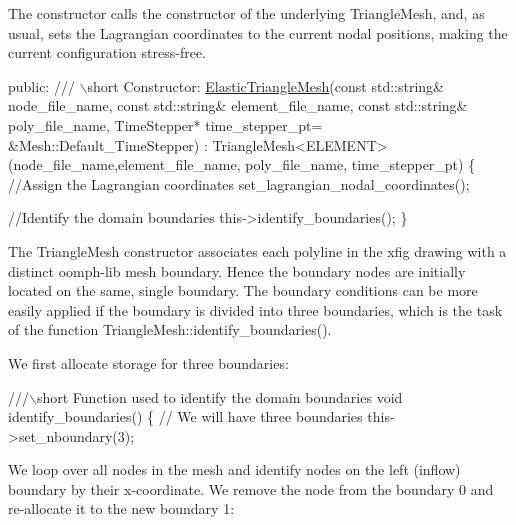 The constructor calls the constructor of the underlying {\ttfamily Triangle\+Mesh}, and, as usual, sets the Lagrangian coordinates to the current nodal positions, making the current configuration stress-\/free.


\begin{DoxyCodeInclude}
 
\textcolor{keyword}{public}:
 \textcolor{comment}{}
\textcolor{comment}{ /// \(\backslash\)short Constructor: }
\textcolor{comment}{} \hyperlink{classElasticTriangleMesh}{ElasticTriangleMesh}(\textcolor{keyword}{const} std::string& node\_file\_name,
                     \textcolor{keyword}{const} std::string& element\_file\_name,
                     \textcolor{keyword}{const} std::string& poly\_file\_name,
                     TimeStepper* time\_stepper\_pt=
                     &Mesh::Default\_TimeStepper) : 
 TriangleMesh<ELEMENT>(node\_file\_name,element\_file\_name,
                       poly\_file\_name, time\_stepper\_pt)
  \{
   \textcolor{comment}{//Assign the Lagrangian coordinates}
   set\_lagrangian\_nodal\_coordinates();
   
   \textcolor{comment}{//Identify the domain boundaries}
   this->identify\_boundaries();
  \}

\end{DoxyCodeInclude}


The {\ttfamily Triangle\+Mesh} constructor associates each polyline in the {\ttfamily xfig} drawing with a distinct {\ttfamily oomph-\/lib} mesh boundary. Hence the boundary nodes are initially located on the same, single boundary. The boundary conditions can be more easily applied if the boundary is divided into three boundaries, which is the task of the function {\ttfamily Triangle\+Mesh\+::identify\+\_\+boundaries()}.

We first allocate storage for three boundaries\+:


\begin{DoxyCodeInclude}

\textcolor{comment}{}
\textcolor{comment}{ ///\(\backslash\)short Function used to identify the domain boundaries}
\textcolor{comment}{} \textcolor{keywordtype}{void} identify\_boundaries()
  \{
   \textcolor{comment}{// We will have three boundaries}
   this->set\_nboundary(3);

\end{DoxyCodeInclude}


We loop over all nodes in the mesh and identify nodes on the left (inflow) boundary by their x-\/coordinate. We remove the node from the boundary 0 and re-\/allocate it to the new boundary 1\+:


